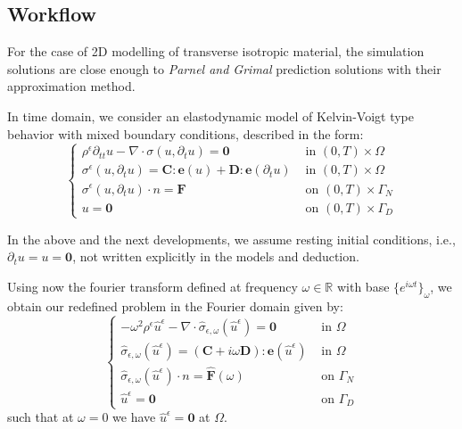 \subsection{Workflow}
\begin{rem}
For the case of 2D modelling of transverse isotropic material, the simulation solutions are close enough to \textit{Parnel and Grimal} prediction solutions with their approximation method.
\end{rem}
In time domain, we consider an elastodynamic model of Kelvin-Voigt type behavior with mixed boundary conditions, described in the form:
\begin{equation*}
    \left \{
    \begin{array}{cc}
        \rho^{\epsilon}\partial_{tt}u - \nabla \cdot \sigma(u, \partial_t u) = \mathbf{0} & \text{ in } (0,T)\times \Omega \\
        \sigma^{\epsilon}(u,\partial_t u)  = \mathbf{C}:\mathbf{e}(u) + \mathbf{D}:\mathbf{e}(\partial_t u) & \text{ in } (0,T)\times\Omega \\
        \sigma^{\epsilon}(u, \partial_t u)\cdot n = \mathbf{F} & \text{ on }(0,T)\times \Gamma_N \\ 
        u = \mathbf{0} & \text{ on } (0,T)\times \Gamma_D
    \end{array}
    \right .
\end{equation*}
\begin{rem}
In the above and the next developments, we assume resting initial conditions, i.e., $\partial_t u = u = \mathbf{0}$, not written explicitly in the models and deduction.
\end{rem}
Using now the fourier transform defined at frequency $\omega \in \mathbb{R}$ with base $\{e^{i\omega t}\}_{\omega}$, we obtain our redefined problem in the Fourier domain given by:
\begin{equation*}
    \left \{
    \begin{array}{cc}
        -\omega^2 \rho^{\epsilon} \hat{u}^{\epsilon} - \nabla \cdot \hat{\sigma}_{\epsilon,\omega}(\hat{u}^{\epsilon}) = \mathbf{0} & \text{ in } \Omega  \\
        \hat{\sigma}_{\epsilon,\omega} (\hat{u}^{\epsilon}) = (\mathbf{C} + i\omega \mathbf{D}):\mathbf{e}(\hat{u}^{\epsilon}) & \text{ in } \Omega \\
        \hat{\sigma}_{\epsilon,\omega} (\hat{u}^{\epsilon}) \cdot n = \hat{\mathbf{F}}(\omega) & \text{ on } \Gamma_N \\
        \hat{u}^{\epsilon} = \mathbf{0} & \text{ on } \Gamma_D
    \end{array}
    \right .
\end{equation*}
such that at $\omega = 0$ we have $\hat{u}^{\epsilon}=\mathbf{0}$ at $\Omega$.\\

